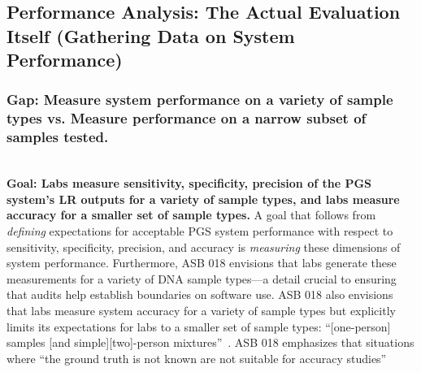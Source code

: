 \subsection{Performance Analysis: The Actual Evaluation Itself (Gathering Data on System Performance)}
\label{sec:performance}

\subsubsection{Gap: Measure system performance on a variety of sample types vs. Measure performance on a narrow subset of samples tested.} 
\label{sec:performance-gap1}
\textbf{\\Goal: Labs measure sensitivity, specificity, precision of the PGS system's LR outputs for a variety of sample types, and labs measure accuracy for a smaller set of sample types.}
A goal that follows from \textit{defining} expectations for acceptable PGS system performance with respect to sensitivity, specificity, precision, and accuracy is \textit{measuring} these dimensions of system performance. Furthermore, ASB 018 envisions that labs generate these measurements for a variety of DNA sample types---a detail crucial to ensuring that audits help establish boundaries on software use. ASB 018 also envisions that labs measure system accuracy for a variety of sample types but explicitly limits its expectations for labs to a smaller set of sample types: ``[one-person] samples [and simple][two]-person mixtures''~\cite[p.1]{asb018}. ASB 018 emphasizes that situations where ``the ground truth is not known are not suitable for accuracy studies''~\cite[p.1]{asb018}


